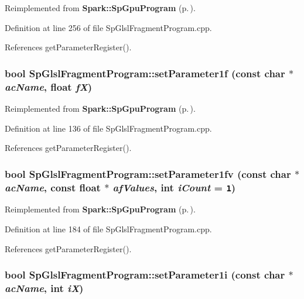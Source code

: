 Reimplemented from {\bf Spark::Sp\-Gpu\-Program} {\rm (p.\,\pageref{classSpark_1_1SpGpuProgram_a30})}.

Definition at line 256 of file Sp\-Glsl\-Fragment\-Program.cpp.

References get\-Parameter\-Register().
\subsubsection{\setlength{\rightskip}{0pt plus 5cm}bool Sp\-Glsl\-Fragment\-Program::set\-Parameter1f (const char $\ast$ {\em ac\-Name}, float {\em f\-X})\hspace{0.3cm}{\tt  [virtual]}}\label{classSpark_1_1SpGlslFragmentProgram_a9}




Reimplemented from {\bf Spark::Sp\-Gpu\-Program} {\rm (p.\,\pageref{classSpark_1_1SpGpuProgram_a20})}.

Definition at line 136 of file Sp\-Glsl\-Fragment\-Program.cpp.

References get\-Parameter\-Register().
\subsubsection{\setlength{\rightskip}{0pt plus 5cm}bool Sp\-Glsl\-Fragment\-Program::set\-Parameter1fv (const char $\ast$ {\em ac\-Name}, const float $\ast$ {\em af\-Values}, int {\em i\-Count} = {\tt 1})\hspace{0.3cm}{\tt  [virtual]}}\label{classSpark_1_1SpGlslFragmentProgram_a13}




Reimplemented from {\bf Spark::Sp\-Gpu\-Program} {\rm (p.\,\pageref{classSpark_1_1SpGpuProgram_a24})}.

Definition at line 184 of file Sp\-Glsl\-Fragment\-Program.cpp.

References get\-Parameter\-Register().
\subsubsection{\setlength{\rightskip}{0pt plus 5cm}bool Sp\-Glsl\-Fragment\-Program::set\-Parameter1i (const char $\ast$ {\em ac\-Name}, int {\em i\-X})\hspace{0.3cm}{\tt  [virtual]}}\label{classSpark_1_1SpGlslFragmentProgram_a1}



